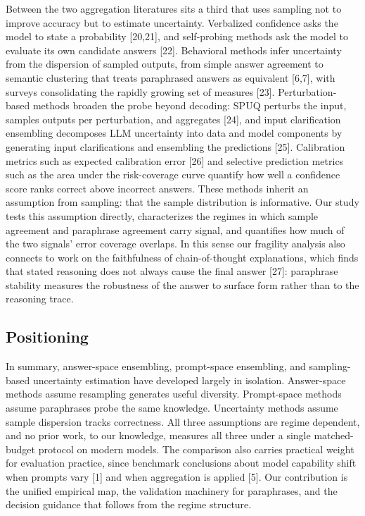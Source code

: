 \documentclass[preprint,12pt]{elsarticle}
\begin{document}
Between the two aggregation literatures sits a third that uses sampling not to improve accuracy but to estimate uncertainty. Verbalized confidence asks the model to state a probability [20,21], and self-probing methods ask the model to evaluate its own candidate answers [22]. Behavioral methods infer uncertainty from the dispersion of sampled outputs, from simple answer agreement to semantic clustering that treats paraphrased answers as equivalent [6,7], with surveys consolidating the rapidly growing set of measures [23]. Perturbation-based methods broaden the probe beyond decoding: SPUQ perturbs the input, samples outputs per perturbation, and aggregates [24], and input clarification ensembling decomposes LLM uncertainty into data and model components by generating input clarifications and ensembling the predictions [25]. Calibration metrics such as expected calibration error [26] and selective prediction metrics such as the area under the risk-coverage curve quantify how well a confidence score ranks correct above incorrect answers. These methods inherit an assumption from sampling: that the sample distribution is informative. Our study tests this assumption directly, characterizes the regimes in which sample agreement and paraphrase agreement carry signal, and quantifies how much of the two signals' error coverage overlaps. In this sense our fragility analysis also connects to work on the faithfulness of chain-of-thought explanations, which finds that stated reasoning does not always cause the final answer [27]: paraphrase stability measures the robustness of the answer to surface form rather than to the reasoning trace.

\subsection{Positioning}

In summary, answer-space ensembling, prompt-space ensembling, and sampling-based uncertainty estimation have developed largely in isolation. Answer-space methods assume resampling generates useful diversity. Prompt-space methods assume paraphrases probe the same knowledge. Uncertainty methods assume sample dispersion tracks correctness. All three assumptions are regime dependent, and no prior work, to our knowledge, measures all three under a single matched-budget protocol on modern models. The comparison also carries practical weight for evaluation practice, since benchmark conclusions about model capability shift when prompts vary [1] and when aggregation is applied [5]. Our contribution is the unified empirical map, the validation machinery for paraphrases, and the decision guidance that follows from the regime structure.
\end{document}
